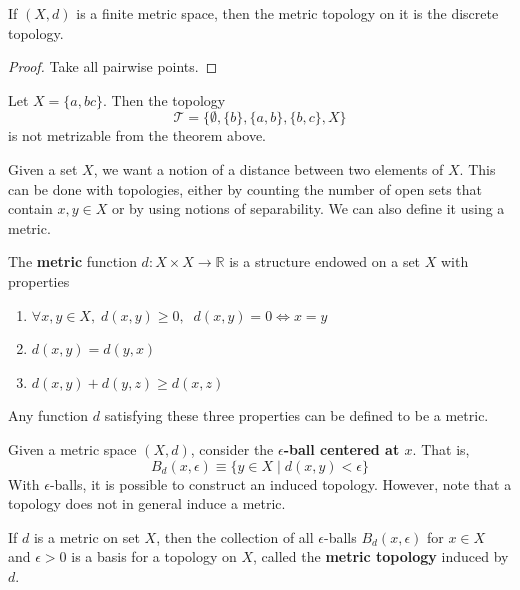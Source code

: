 \documentclass{article}
\begin{document}
  \begin{theorem}
    If $(X, d)$ is a finite metric space, then the metric topology on it is the discrete topology. 
  \end{theorem}
  \begin{proof}
    Take all pairwise points. 
  \end{proof}

  \begin{example}
    Let $X = \{a, b c\}$. Then the topology 
    \begin{equation}
      \mathscr{T} = \{\emptyset, \{b\}, \{a, b\}, \{b, c\}, X \}
    \end{equation} 
    is not metrizable from the theorem above. 
  \end{example}


  Given a set $X$, we want a notion of a distance between two elements of $X$. This can be done with topologies, either by counting the number of open sets that contain $x, y \in X$ or by using notions of separability. We can also define it using a metric. 

  \begin{definition}
  The \textbf{metric} function $d: X \times X \longrightarrow \mathbb{R}$ is a structure endowed on a set $X$ with properties 
  \begin{enumerate}
      \item $\forall x, y \in X, \; d(x, y) \geq 0, \; \; d(x, y) = 0 \iff x = y$
      \item $d(x, y) = d(y, x)$ 
      \item $d(x, y) + d(y, z) \geq d(x, z)$
  \end{enumerate}
  Any function $d$ satisfying these three properties can be defined to be a metric. 
  \end{definition}

  Given a metric space $(X, d)$, consider the \textbf{$\epsilon$-ball centered at $x$}. That is, 
  \[B_d (x, \epsilon) \equiv \{y \in X \; | \; d(x, y) < \epsilon\}\]
  With $\epsilon$-balls, it is possible to construct an induced topology. However, note that a topology does not in general induce a metric. 

  \begin{definition}
  If $d$ is a metric on set $X$, then the collection of all $\epsilon$-balls $B_d (x, \epsilon)$ for $x \in X$ and $\epsilon > 0$ is a basis for a topology on $X$, called the \textbf{metric topology} induced by $d$. 
  \end{definition}
\end{document}
